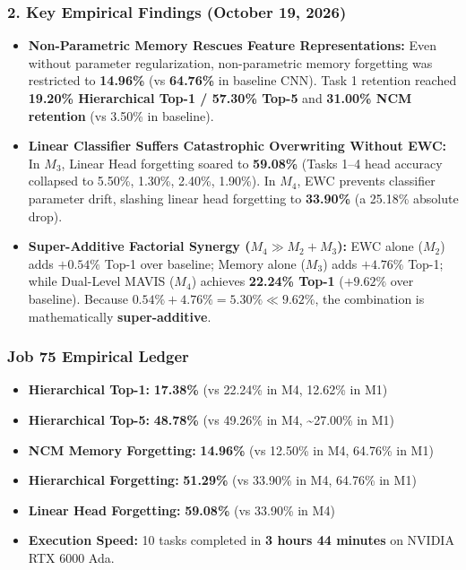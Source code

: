 \documentclass[11pt,a4paper]{article}
\begin{document}
    \subsubsection{2. Key Empirical Findings (October 19, 2026)}
    \begin{itemize}[leftmargin=*]
        \item \textbf{Non-Parametric Memory Rescues Feature Representations:} Even without parameter regularization, non-parametric memory forgetting was restricted to \textbf{14.96\%} (vs \textbf{64.76\%} in baseline CNN). Task 1 retention reached \textbf{19.20\% Hierarchical Top-1 / 57.30\% Top-5} and \textbf{31.00\% NCM retention} (vs 3.50\% in baseline).
        \item \textbf{Linear Classifier Suffers Catastrophic Overwriting Without EWC:} In $M_3$, Linear Head forgetting soared to \textbf{59.08\%} (Tasks 1--4 head accuracy collapsed to 5.50\%, 1.30\%, 2.40\%, 1.90\%). In $M_4$, EWC prevents classifier parameter drift, slashing linear head forgetting to \textbf{33.90\%} (a 25.18\% absolute drop).
        \item \textbf{Super-Additive Factorial Synergy ($M_4 \gg M_2 + M_3$):} EWC alone ($M_2$) adds $+0.54\%$ Top-1 over baseline; Memory alone ($M_3$) adds $+4.76\%$ Top-1; while Dual-Level MAVIS ($M_4$) achieves \textbf{22.24\% Top-1} ($+9.62\%$ over baseline). Because $0.54\% + 4.76\% = 5.30\% \ll 9.62\%$, the combination is mathematically \textbf{super-additive}.
    \end{itemize}

    \subsubsection{Job 75 Empirical Ledger}
    \begin{itemize}[leftmargin=*]
        \item \textbf{Hierarchical Top-1:} \textbf{17.38\%} (vs 22.24\% in M4, 12.62\% in M1)
        \item \textbf{Hierarchical Top-5:} \textbf{48.78\%} (vs 49.26\% in M4, \textasciitilde 27.00\% in M1)
        \item \textbf{NCM Memory Forgetting:} \textbf{14.96\%} (vs 12.50\% in M4, 64.76\% in M1)
        \item \textbf{Hierarchical Forgetting:} \textbf{51.29\%} (vs 33.90\% in M4, 64.76\% in M1)
        \item \textbf{Linear Head Forgetting:} \textbf{59.08\%} (vs 33.90\% in M4)
        \item \textbf{Execution Speed:} 10 tasks completed in \textbf{3 hours 44 minutes} on NVIDIA RTX 6000 Ada.
    \end{itemize}
\end{document}
